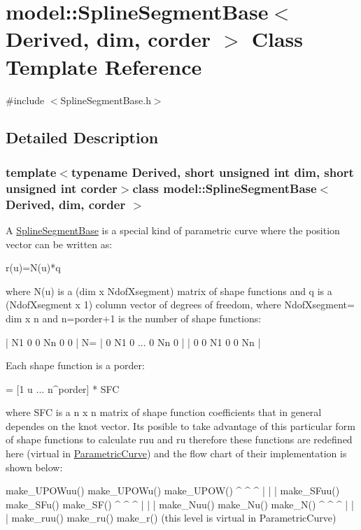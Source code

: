 \hypertarget{classmodel_1_1_spline_segment_base}{}\section{model\+:\+:Spline\+Segment\+Base$<$ Derived, dim, corder $>$ Class Template Reference}
\label{classmodel_1_1_spline_segment_base}


{\ttfamily \#include $<$Spline\+Segment\+Base.\+h$>$}



\subsection{Detailed Description}
\subsubsection*{template$<$typename Derived, short unsigned int dim, short unsigned int corder$>$class model\+::\+Spline\+Segment\+Base$<$ Derived, dim, corder $>$}

A \hyperlink{classmodel_1_1_spline_segment_base}{Spline\+Segment\+Base} is a special kind of parametric curve where the position vector can be written as\+: \begin{DoxyVerb}r(u)=N(u)*q
\end{DoxyVerb}
 where N(u) is a (dim x Ndof\+Xsegment) matrix of shape functions and q is a (Ndof\+Xsegment x 1) column vector of degrees of freedom, where Ndof\+Xsegment= dim x n and n=porder+1 is the number of shape functions\+: \begin{DoxyVerb}| N1  0  0              Nn  0  0 |
N= |  0 N1  0   ...  0 Nn  0 |
|  0  0 N1               0  0 Nn |
\end{DoxyVerb}


Each shape function is a porder\+: \begin{DoxyVerb}[N1 ... Nn]= [1 u ... n^porder] * SFC
\end{DoxyVerb}
 where S\+F\+C is a n x n matrix of shape function coefficients that in general dependes on the knot vector. It\textquotesingle{}s posible to take advantage of this particular form of shape functions to calculate ruu and ru therefore these functions are redefined here (virtual in \hyperlink{classmodel_1_1_parametric_curve}{Parametric\+Curve}) and the flow chart of their implementation is shown below\+: \begin{DoxyVerb}make_UPOWuu()     make_UPOWu()  make_UPOW()
^                                 ^                             ^
|                                 |                             | 
make_SFuu()       make_SFu()    make_SF()
^                                 ^                             ^
|                                 |                             |
make_Nuu()                make_Nu()             make_N()
^                                 ^                             ^
|                                 |                             |
make_ruu()                make_ru()             make_r()        (this level is virtual in ParametricCurve)
\end{DoxyVerb}
 

